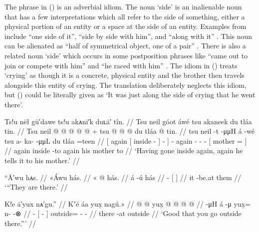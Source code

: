 The phrase  in (\lastx) is an adverbial idiom.
The noun  ‘side’ is an inalienable noun that has a few interpretations which all refer to the side of something, either a physical portion of an entity or a space at the side of an entity.
Examples from \citeauthor{leer:1973} include  “one side of it”,  “side by side with him”, and  “along with it” \parencite[f06/123]{leer:1973}.
This noun can be alienated as  “half of symmetrical object, one of a pair” \parencite[f06/123]{leer:1973}.
There is also a related noun  ‘side’ which occurs in some postposition phrases like  “came out to join or compete with him” and  “he raced with him” \parencite[f06/123]{leer:1973}.
The idiom in (\lastx) treats  ‘crying’ as though it is a concrete, physical entity and the brother then travels alongside this entity of crying.
The translation deliberately neglects this idiom, but (\lastx) could be literally given as ‘It was just along the side of crying that he went there’.

\ex\label{ex:92-182-again-inside-again-tell}%
%
\begingl
	\glpreamble	Ts!u nēł gū′dawe ts!u akᴀnī′k duʟā′ tîn. //
	\glpreamble	Tsu neil góot áwé tsu akaneek du tláa tin. //
	\gla	{} Tsu {} neil @ {} {}  @ {} @ {} @ {} {}  @ {} +
		tsu  @ {} @ {} @ {}
		{} du tláa @ \•tin. {} //
	\glb	{} tsu {} neil -t {} {}  -μμH {} {} á -wé
		tsu a- ka-  -μμL
		{} du tláa =teen {} //
	\glc	{}[ again {}[ inside - {}]
		\·  - \· {}]  -
		again - -  -
		{}[  mother = {}] //
	\gld	{} again {} inside -to {}  {} {} {} {}
		 {}
		again  {} {} {}
		{} his mother \•to {} //
	\glft	‘Having gone inside again, again he tells it to his mother.’
		//
\endgl
\xe

\ex\label{ex:92-183-they-are-there}%
%
\begingl
	\glpreamble	“Ā′wu hᴀs. //
	\glpreamble	«\!Áwu hás. //
	\gla	«\! @ {} {} hás. {} //
	\glb	\pqp{}á -ú {} hás {} //
	\glc	\pqp{} - {}[  {}] //
	\gld	\pqp{}it -be.at {} them {} //
	\glft	‘“They are there.’
		//
\endgl
\xe

\ex\label{ex:92-184-good-go-outside}%
%
\begingl
	\glpreamble	K!e ā′yux nᴀ′gu.” //
	\glpreamble	Kʼé áa yux̱ nagú.\!» //
	\gla	{} @ {} {}  @ {} {}
		yux̱ @  @ {} @ {} @ {} //
	\glb	{} -μH {} á -μ {}
		yux̱= n- {}  -⊗ //
	\glc	{} - {}[  - {}]
		outside= - \·  - //
	\gld	{} {} {} there -at {}
		outside\•  {} {} {} //
	\glft	‘Good that you go outside there.”’
		//
\endgl
\xe

